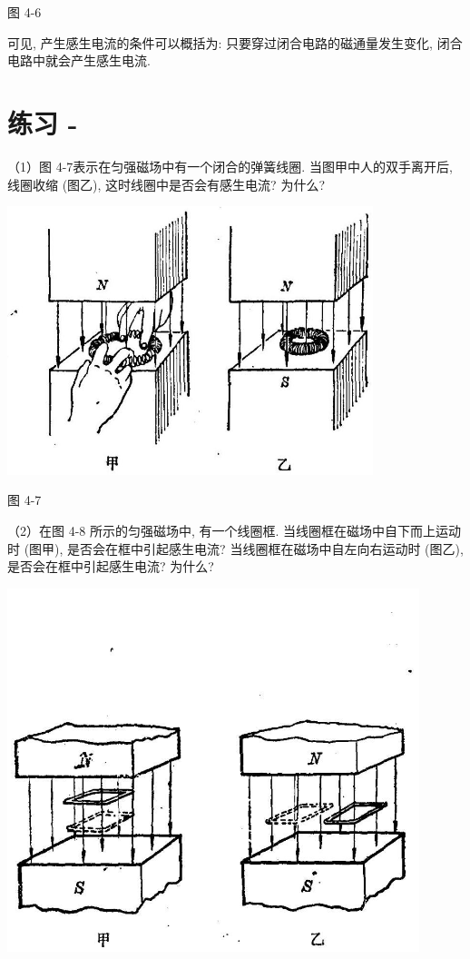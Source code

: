 \documentclass[10pt]{article}
\begin{document}
图 4-6

可见, 产生感生电流的条件可以概括为: 只要穿过闭合电路的磁通量发生变化, 闭合电路中就会产生感生电流.

\section*{练习 -}

（1）图 4-7表示在匀强磁场中有一个闭合的弹簧线圈. 当图甲中人的双手离开后, 线圈收缩 (图乙), 这时线圈中是否会有感生电流? 为什么?

\begin{center}
\includegraphics[max width=0.8\textwidth]{images/01913056-1f15-74d8-9184-9aab52c9d66b_136_947311.jpg}
\end{center}

图 4-7

（2）在图 4-8 所示的匀强磁场中, 有一个线圈框. 当线圈框在磁场中自下而上运动时 (图甲), 是否会在框中引起感生电流? 当线圈框在磁场中自左向右运动时 (图乙), 是否会在框中引起感生电流? 为什么?

\begin{center}
\includegraphics[max width=0.9\textwidth]{images/01913056-1f15-74d8-9184-9aab52c9d66b_137_106331.jpg}
\end{center}
\end{document}
